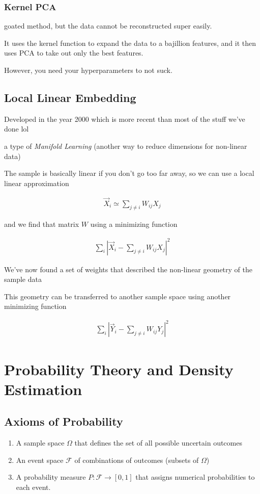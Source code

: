 \documentclass[fleqn]{report}
\newcommand{\equations} [1] {
\begin{gather*}
#1
\end{gather*}
}
\begin{document}
\subsection{Kernel PCA}
goated method, but the data cannot be reconstructed super easily. 

It uses the kernel function to expand the data to a bajillion features, 
and it then uses PCA to take out only the best features.

However, you need your hyperparameters to not suck. 

\section{Local Linear Embedding}
Developed in the year 2000 which is more recent than most of the stuff we've 
done lol 

a type of \textit{Manifold Learning} (another way to reduce dimensions 
for non-linear data)

The sample is basically linear if you don't go too far away, so we 
can use a local linear approximation 
\equations{
    \vec X_i \simeq \sum_{j \neq i} W_{ij} X_j
}
and we find that matrix $W$ using a minimizing function 
\equations{
    \sum_i |\vec X_i - \sum_{j \neq i} W_{ij} X_j|^2
}
We've now found a set of weights that described the non-linear geometry 
of the sample data 

This geometry can be transferred to another sample space 
using another minimizing function 
\equations{
    \sum_i |\vec Y_i - \sum_{j \neq i} W_{ij} Y_j|^2
}

\chapter{Probability Theory and Density Estimation}
\section{Axioms of Probability}
\begin{enumerate}
    \item 
    A sample space $\Omega$ that defines the set 
    of all possible uncertain outcomes 
    \item 
    An event space $\mathcal F$ of combinations 
    of outcomes (subsets of $\Omega$)
    \item 
    A probability measure $P: \mathcal F \to [0, 1]$
    that assigns numerical probabilities to each event. 
\end{enumerate}
\end{document}
